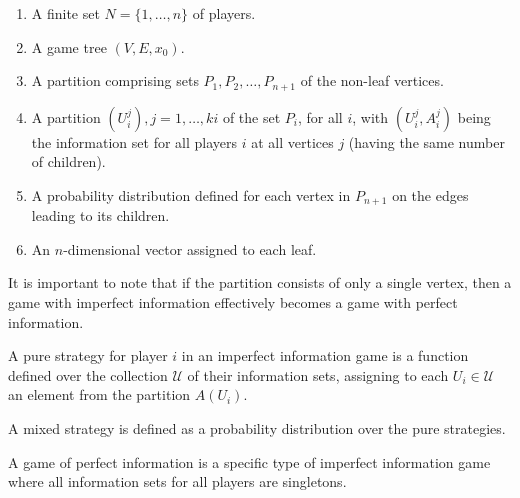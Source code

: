 \begin{enumerate}
    \item A finite set $N = \{1, \dots, n\}$ of players. 
    \item A game tree $(V, E, x_0)$. 
    \item A partition comprising sets $P_1, P_2, \dots, P_{n+1}$ of the non-leaf vertices.
    \item A partition $(U^j_i), j = 1, \dots, ki$ of the set $P_i$, for all $i$, with $(U^j_i, A^j_i)$ being the information set for all players $i$ at all vertices $j$ (having the same number of children). 
    \item A probability distribution defined for each vertex in $P_{n+1}$ on the edges leading to its children.
    \item An $n$-dimensional vector assigned to each leaf.
\end{enumerate}
It is important to note that if the partition consists of only a single vertex, then a game with imperfect information effectively becomes a game with perfect information.
\begin{definition}
    A pure strategy for player $i$ in an imperfect information game is a function defined over the collection $\mathcal{U}$ of their information sets, assigning to each $U_i\in\mathcal{U}$ an element from the partition $A(U_i)$. 
\end{definition}
\begin{definition}
    A mixed strategy is defined as a probability distribution over the pure strategies.
\end{definition}
A game of perfect information is a specific type of imperfect information game where all information sets for all players are singletons.